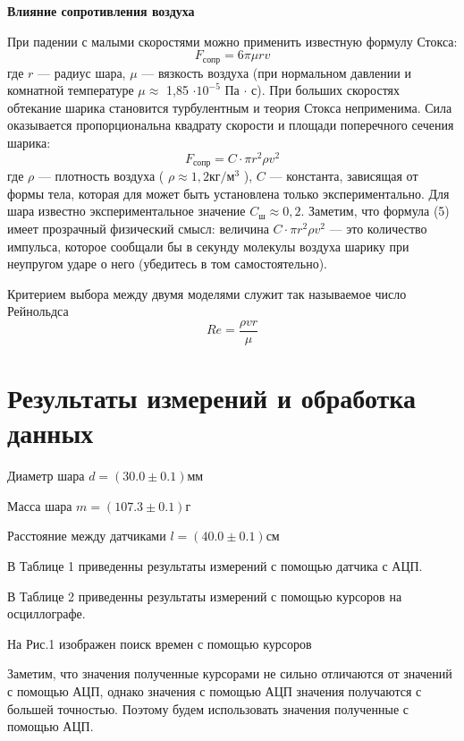 \documentclass[12pt]{article}
\begin{document}
\begin{center}
    \textbf{Влияние сопротивления воздуха}
\end{center}

При падении с малыми скоростями можно применить известную формулу Стокса:
\begin{equation}
F_{сопр} = 6 \pi\mu r v
\end{equation}
где $r$ — радиус шара, $\mu$ — вязкость воздуха (при нормальном  давлении и комнатной температуре $\mu \approx$ 1,85 $\cdot 10^{-5}$ Па $\cdot$ с).
При больших скоростях обтекание шарика становится турбулентным и теория Стокса неприменима. Сила оказывается пропорциональна квадрату скорости и площади поперечного сечения шарика:
\begin{equation}\label{сигма}
F_{сопр} = C \cdot \pi r^2 \rho v^2
\end{equation}
где $\rho$ — плотность воздуха ( $\rho \approx 1,2 \text{кг}/\text{м}^3$ ), $C$ — константа, зависящая от формы тела, которая для может быть установлена только экспериментально.
Для шара известно экспериментальное значение $C_{ш}\approx 0,2$. Заметим, что формула (5) имеет прозрачный физический смысл: величина $C \cdot \pi r^2 \rho v^2$ — это количество импульса, которое сообщали бы в секунду молекулы воздуха шарику при
неупругом ударе о него (убедитесь в том самостоятельно).

Критерием выбора между двумя моделями служит так называемое число Рейнольдса
\begin{equation}\label{сигма}
Re = \frac{\rho v r}{\mu}
\end{equation}

\section{Результаты измерений и обработка данных}
Диаметр шара $d=(30.0 \pm 0.1)\text{мм}$

Масса шара $m=(107.3 \pm 0.1)\text{г}$

Расстояние между датчиками $l=(40.0 \pm 0.1)\text{см}$

В Таблице 1 приведенны результаты измерений с помощью датчика с АЦП.

В Таблице 2 приведенны результаты измерений с помощью курсоров на осциллографе.

На Рис.1 изображен поиск времен с помощью курсоров

Заметим, что значения полученные курсорами не сильно отличаются от значений с помощью АЦП, однако значения с помощью АЦП значения получаются с большей точностью. Поэтому будем использовать значения полученные с помощью АЦП.
\end{document}
